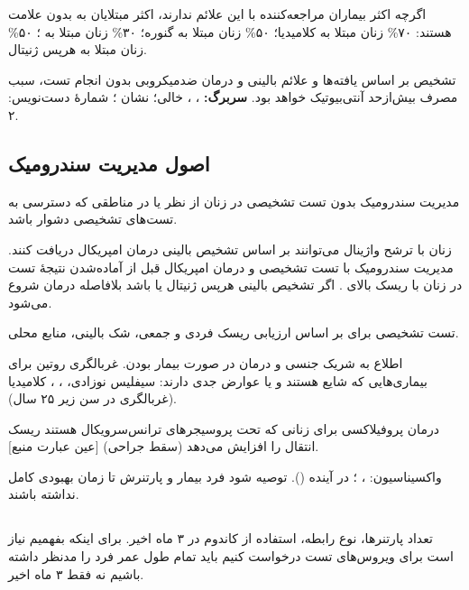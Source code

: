 \documentclass[12pt,a4paper]{article}
\begin{document}
اگرچه اکثر بیماران مراجعه‌کننده با این علائم  ندارند، اکثر مبتلایان به  بدون علامت هستند:
۷۰\% زنان مبتلا به کلامیدیا؛ ۵۰\% زنان مبتلا به گنوره؛ ۳۰\% زنان مبتلا به ؛ ۵۰\% زنان مبتلا به هرپس ژنیتال.

تشخیص بر اساس یافته‌ها و علائم بالینی و درمان ضدمیکروبی بدون انجام تست، سبب مصرف بیش‌ازحد آنتی‌بیوتیک خواهد بود.
\textbf{سربرگ:} ، ،  خالی؛ نشان ؛ شمارهٔ دست‌نویس: ۲.
\subsection*{اصول مدیریت سندرومیک }
مدیریت سندرومیک بدون تست تشخیصی در زنان  از نظر  یا در مناطقی که دسترسی به تست‌های تشخیصی دشوار باشد.

زنان با ترشح واژینال می‌توانند بر اساس تشخیص بالینی درمان امپریکال دریافت کنند.
مدیریت سندرومیک با تست تشخیصی و درمان امپریکال قبل از آماده‌شدن نتیجهٔ تست در زنان با ریسک بالای .
اگر تشخیص بالینی هرپس ژنیتال یا  باشد بلافاصله درمان شروع می‌شود.

تست تشخیصی برای  بر اساس ارزیابی ریسک فردی و جمعی، شک بالینی، منابع محلی.

اطلاع به شریک جنسی و درمان در صورت بیمار بودن.
غربالگری روتین برای بیماری‌هایی که شایع هستند و یا عوارض جدی دارند:
سیفلیس نوزادی، ، ، کلامیدیا (غربالگری در سن زیر ۲۵ سال).

درمان پروفیلاکسی برای زنانی که تحت پروسیجرهای ترانس‌سرویکال هستند ریسک انتقال  را افزایش می‌دهد (سقط جراحی) [عین عبارت منبع].

واکسیناسیون: ، ؛ در آینده ().
توصیه شود فرد بیمار و پارتنرش تا زمان بهبودی کامل  نداشته باشند.
\subsection*{}
تعداد پارتنرها، نوع رابطه، استفاده از کاندوم در ۳ ماه اخیر.
برای اینکه بفهمیم نیاز است برای ویروس‌های  تست درخواست کنیم باید تمام طول عمر فرد را مدنظر داشته باشیم نه فقط ۳ ماه اخیر.
\end{document}
